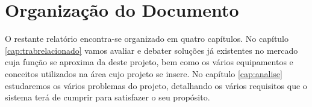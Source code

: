\section{Organização do Documento} \label{sec12}
O restante relatório encontra-se organizado em quatro capítulos. No capítulo \ref{cap:trabrelacionado} vamos avaliar e debater soluções já existentes no mercado cuja função se aproxima da deste projeto, bem como os vários equipamentos e conceitos utilizados na área cujo projeto se insere. No capítulo \ref{cap:analise} estudaremos os vários problemas do projeto, detalhando os vários requisitos que o sistema terá de cumprir para satisfazer o seu propósito. 
